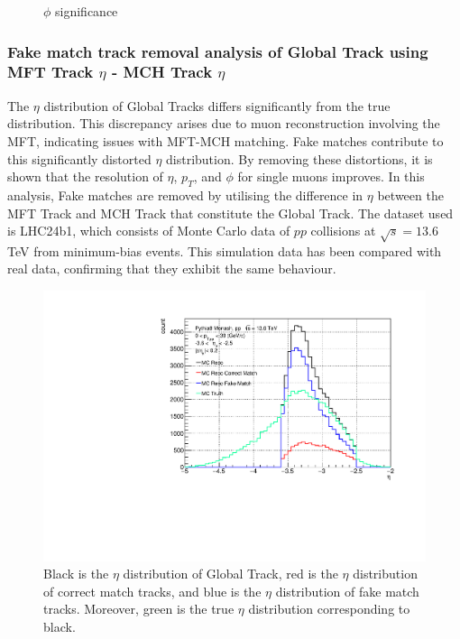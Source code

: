 \begin{figure}[htbp]
\begin{minipage}{0.45\textwidth}
                    \caption{$\phi$ significance}
                    \label{fig:phi_significance}
                \end{minipage}
            \end{figure}

        \subsubsection{Fake match track removal analysis of Global Track using MFT Track $\eta$ - MCH Track $\eta$}
        \label{Analysis:Matching}
            The \(\eta\) distribution of Global Tracks differs significantly from the true distribution. This discrepancy arises due to muon reconstruction involving the MFT, indicating issues with MFT-MCH matching. Fake matches contribute to this significantly distorted \(\eta\) distribution. By removing these distortions, it is shown that the resolution of \(\eta\), \(p_T\), and \(\phi\) for single muons improves. In this analysis, Fake matches are removed by utilising the difference in \(\eta\) between the MFT Track and MCH Track that constitute the Global Track. The dataset used is LHC24b1, which consists of Monte Carlo data of \(pp\) collisions at \(\sqrt{s} = 13.6\) TeV from minimum-bias events. This simulation data has been compared with real data, confirming that they exhibit the same behaviour. %
            \begin{figure}[H]
                \centering
                \includegraphics[keepaspectratio, scale=0.5]{fig/3_5_6_etacutno_eta.pdf}
                \caption{Black is the $\eta$ distribution of Global Track, red is the $\eta$ distribution of correct match tracks, and blue is the $\eta$ distribution of fake match tracks. Moreover, green is the true $\eta$ distribution corresponding to black.}
                \label{Analysis:Matching:eta}
            \end{figure}
